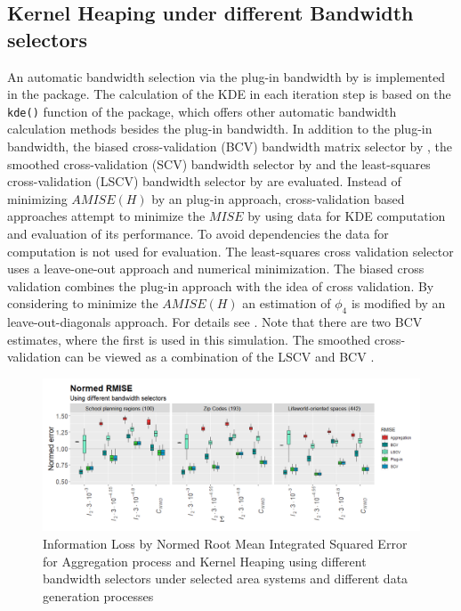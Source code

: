 \subsection{Kernel Heaping under different Bandwidth selectors}

An automatic bandwidth selection via the plug-in bandwidth by \cite{Wand94} is implemented in the \hyperlink{https://cran.r-project.org/web/packages/Kernelheaping/index.html}{} package. 
The calculation of the KDE in each iteration step is based on the \texttt{kde()} function of the \hyperlink{https://cran.r-project.org/web/packages/ks/index.html}{} package, which offers other automatic bandwidth calculation methods besides the plug-in bandwidth. 
In addition to the plug-in bandwidth, the biased cross-validation (BCV) bandwidth matrix selector by \cite{Sain1994}, the smoothed cross-validation (SCV) bandwidth selector by \cite{Duong2005} and the least-squares cross-validation (LSCV) bandwidth selector by \cite{Bowman} are evaluated.
Instead of minimizing $AMISE(H)$ by an plug-in approach, cross-validation based approaches attempt to minimize the $MISE$ by using data for KDE computation and evaluation of its performance. To avoid dependencies the data for computation is not used for evaluation. The least-squares cross validation selector uses a leave-one-out approach and numerical minimization. The biased cross validation combines the plug-in approach with the idea of cross validation. By considering to minimize the $AMISE(H)$ an estimation of $\phi_4$ is modified by an leave-out-diagonals approach. For details see \cite{Sain1994}. Note that there are two BCV estimates, where the first is used in this simulation.  
The smoothed cross-validation can be viewed as a combination of the LSCV and BCV
\cite{Duong2005}. \\
\begin{figure}[ht]
    \centering
    \includegraphics[width = \textwidth]{Figure/NormedRMISEBandwidth.png}
    \caption{Information Loss by Normed Root Mean Integrated Squared Error for Aggregation process and Kernel Heaping using different bandwidth selectors under selected area systems and different data generation processes }
    \label{fig:NormedRMISEBandwidth}
\end{figure}

